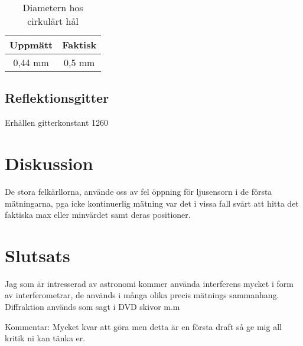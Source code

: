 \documentclass[a4paper]{article}
\begin{document}
\begin{table}
    \caption{Diametern hos cirkulärt hål}
    \label{tab:diameter}
    \centering
    \begin{tabular}{c|c}
        Uppmätt & Faktisk \\
        \hline
        0,44 mm & 0,5 mm \\
    \end{tabular}
\end{table}


\subsection{Reflektionsgitter}

Erhållen gitterkonstant 1260

\section{Diskussion}

De stora felkärllorna, använde oss av fel öppning för ljusensorn i de första mätningarna, pga icke kontinuerlig mätning var det i vissa fall svårt att hitta det faktiska max eller minvärdet samt deras positioner. 

\section{Slutsats}

Jag som är intresserad av astronomi kommer använda interferens mycket i form av interferometrar, de används i många olika precis mätnings sammanhang. Diffraktion används som sagt i DVD skivor m.m

Kommentar: 
Mycket kvar att göra men detta är en första draft så ge mig all kritik ni kan tänka er. 

\pagebreak
\printbibliography
\end{document}
